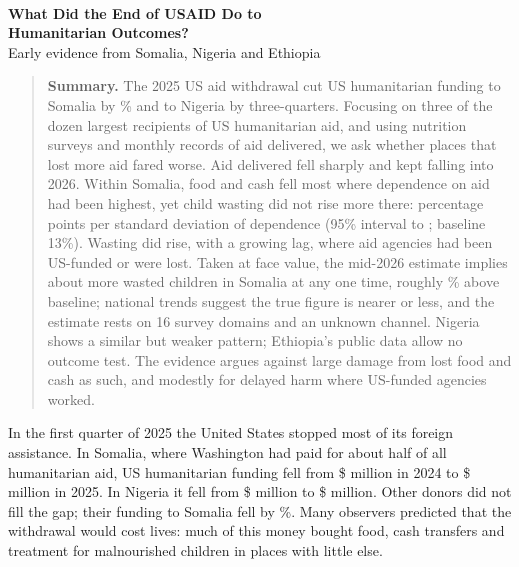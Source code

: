 \documentclass[11pt]{article}
\newcommand{\hd}[1]{\par\bigskip{\sffamily\large\bfseries\color{navy}#1}\par\smallskip}
\begin{document}
{\\[4pt]
{\LARGE\bfseries What Did the End of USAID Do to\\[2pt] Humanitarian Outcomes?}\\[6pt]
{\large Early evidence from Somalia, Nigeria and Ethiopia}}

\bigskip
\begin{quote}\small
\textbf{Summary.} The 2025 US aid withdrawal cut US humanitarian funding to Somalia by \nUsDrop\% and to Nigeria by three-quarters. Focusing on three of the dozen largest recipients of US humanitarian aid, and using nutrition surveys and monthly records of aid delivered, we ask whether places that lost more aid fared worse. Aid delivered fell sharply and kept falling into 2026. Within Somalia, food and cash fell most where dependence on aid had been highest, yet child wasting did not rise more there: \nsumIdxGam{} percentage points per standard deviation of dependence (95\% interval \nsumIdxGamLo{} to \nsumIdxGamHi; baseline 13\%). Wasting did rise, with a growing lag, where aid agencies had been US-funded or were lost. Taken at face value, the mid-2026 estimate implies about \nscSomKidsLossTs{} more wasted children in Somalia at any one time, roughly \nscSomPctIncLossTs\% above baseline; national trends suggest the true figure is nearer \nscSomKidsNatTs{} or less, and the estimate rests on 16 survey domains and an unknown channel. Nigeria shows a similar but weaker pattern; Ethiopia's public data allow no outcome test. The evidence argues against large damage from lost food and cash as such, and modestly for delayed harm where US-funded agencies worked.
\end{quote}

\hd{1. The question and the answer}

In the first quarter of 2025 the United States stopped most of its foreign assistance. In Somalia, where Washington had paid for about half of all humanitarian aid, US humanitarian funding fell from \$\nUsTwentyFour{} million in 2024 to \$\nUsTwentyFive{} million in 2025. In Nigeria it fell from \$\nngUsTf{} million to \$\nngUsTv{} million. Other donors did not fill the gap; their funding to Somalia fell by \nOtherDrop\%. Many observers predicted that the withdrawal would cost lives: much of this money bought food, cash transfers and treatment for malnourished children in places with little else.
\end{document}

